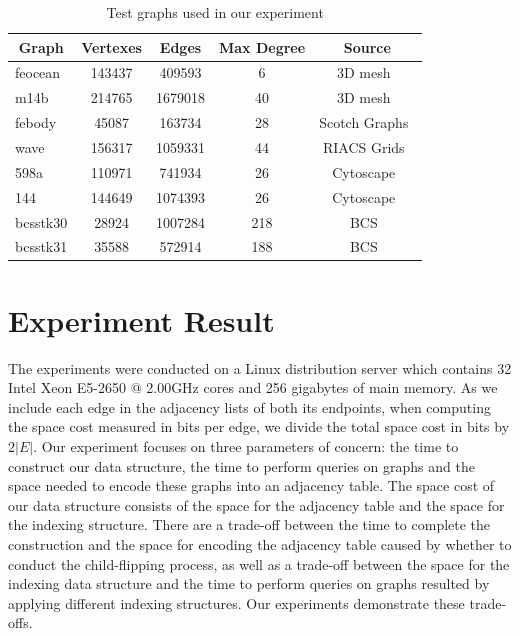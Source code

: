 \documentclass[12pt,glossary]{dalthesis}
\begin{document}
\begin{table}[ht]
\centering
\caption{ Test graphs used in our experiment }
\label{graph-list}
\begin{tabular}{|l||c|c|c|c|}
\hline
\multicolumn{1}{|c||}{Graph} & Vertexes & Edges   & Max Degree & Source        \\ \hline
feocean                   & 143437   & 409593  & 6          & 3D mesh~\cite{3DMESH}        \\
m14b                      & 214765   & 1679018 & 40         & 3D mesh~\cite{3DMESH}       \\
febody                    & 45087    & 163734  & 28         & Scotch Graphs~\cite{Scotch} \\ 
wave                      & 156317   & 1059331 & 44         & RIACS Grids~\cite{RIACS}    \\
598a                      & 110971   & 741934  & 26         & Cytoscape~\cite{Cytoscape}      \\
144                       & 144649   & 1074393 & 26         & Cytoscape~\cite{Cytoscape}     \\
bcsstk30                  & 28924    & 1007284 & 218        & BCS~\cite{Matrix}    \\
bcsstk31                  & 35588    & 572914  & 188        & BCS~\cite{Matrix}     \\ \hline
\end{tabular}
\end{table}


\section{Experiment Result} 
The experiments were conducted on a Linux distribution server which contains 32 Intel Xeon E5-2650 @ 2.00GHz cores and 256 gigabytes of main memory. As we include each edge in the adjacency lists of both its endpoints, when computing the space cost measured in bits per edge, we divide the total space cost in bits by $2|E|$. Our experiment focuses on three parameters of concern: the time to construct our data structure, the time to perform queries on graphs and the space needed to encode these graphs into an adjacency table. The space cost of our data structure consists of the space for the adjacency table and the space for the indexing structure. There are a trade-off between the time to complete the construction and the space for encoding the adjacency table caused by whether to conduct the child-flipping process, as well as a trade-off between the space for the indexing data structure and the time to perform queries on graphs resulted by applying different indexing structures. Our experiments demonstrate these trade-offs.
\end{document}
